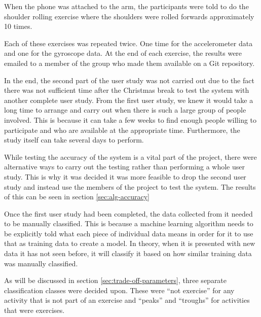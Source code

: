 When the phone was attached to the arm, the participants were told to do the shoulder rolling exercise where the shoulders were rolled forwards approximately 10 times.

Each of these exercises was repeated twice. One time for the accelerometer data and one for the gyroscope data. At the end of each exercise, the results were emailed to a member of the group who made them available on a Git repository.

In the end, the second part of the user study was not carried out due to the fact there was not sufficient time after the Christmas break to test the system with another complete user study. From the first user study, we knew it would take a long time to arrange and carry out when there is such a large group of people involved. This is because it can take a few weeks to find enough people willing to participate and who are available at the appropriate time. Furthermore, the study itself can take several days to perform. 

While testing the accuracy of the system is a vital part of the project, there were alternative ways to carry out the testing rather than performing a whole user study. This is why it was decided it was more feasible to drop the second user study and instead use the members of the project to test the system. The results of this can be seen in section \ref{sec:alg-accuracy}

Once the first user study had been completed, the data collected from it needed to be manually classified. This is because a machine learning algorithm needs to be explicitly told what each piece of individual data means in order for it to use that as training data to create a model. In theory, when it is presented with new data it has not seen before, it will classify it based on how similar training data was manually classified.

As will be discussed in section \ref{sec:trade-off-parameters}, three separate classification classes were decided upon. These were “not exercise” for any activity that is not part of an exercise and “peaks” and “troughs” for activities that were exercises. 

